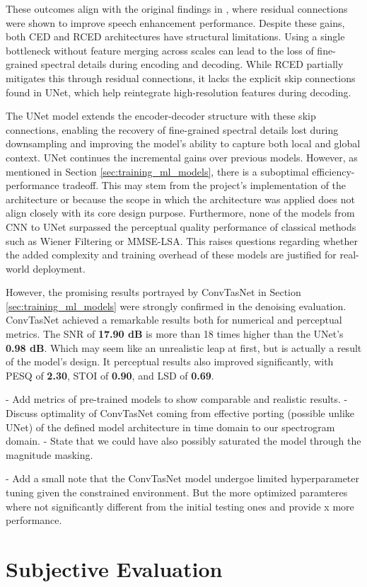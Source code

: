 These outcomes align with the original findings in \cite{park2017acoustic}, where residual connections were shown to improve speech enhancement performance. Despite these gains, both CED and RCED architectures have structural limitations. Using a single bottleneck without feature merging across scales can lead to the loss of fine-grained spectral details during encoding and decoding. While RCED partially mitigates this through residual connections, it lacks the explicit skip connections found in UNet, which help reintegrate high-resolution features during decoding.

The UNet model extends the encoder-decoder structure with these skip connections, enabling the recovery of fine-grained spectral details lost during downsampling and improving the model’s ability to capture both local and global context. UNet continues the incremental gains over previous models. However, as mentioned in Section \ref{sec:training_ml_models}, there is a suboptimal efficiency-performance tradeoff. This may stem from the project's implementation of the architecture or because the scope in which the architecture was applied does not align closely with its core design purpose. Furthermore, none of the models from CNN to UNet surpassed the perceptual quality performance of classical methods such as Wiener Filtering or MMSE-LSA. This raises questions regarding whether the added complexity and training overhead of these models are justified for real-world deployment.

However, the promising results portrayed by ConvTasNet in Section \ref{sec:training_ml_models} were strongly confirmed in the denoising evaluation. ConvTasNet achieved a remarkable results both for numerical and perceptual metrics. The SNR of \textbf{17.90 dB} is more than 18 times higher than the UNet's \textbf{0.98 dB}. Which may seem like an unrealistic leap at first, but is actually a result of the model's design. It perceptual results also improved significantly, with PESQ of \textbf{2.30}, STOI of \textbf{0.90}, and LSD of \textbf{0.69}. 

- Add metrics of pre-trained models to show comparable and realistic results.
- Discuss optimality of ConvTasNet coming from effective porting (possible unlike UNet) of the defined model architecture in time domain to our spectrogram domain.
- State that we could have also possibly saturated the model through the magnitude masking.

\vspace{2em}

- Add a small note that the ConvTasNet model undergoe limited hyperparameter tuning given the constrained environment. But the more optimized paramteres where not significantly different from the initial testing ones and provide x more performance.


\section{Subjective Evaluation}
\label{sec:subjective_evaluation}

